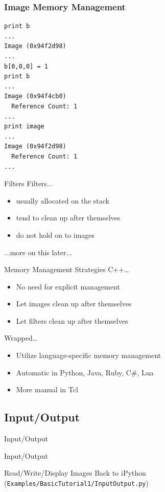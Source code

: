 \begin{frame}[fragile]
\frametitle{Image Memory Management}
\lstpython
\begin{lstlisting}
print b
...
Image (0x94f2d98)
...
b[0,0,0] = 1
print b
...
Image (0x94f4cb0)
  Reference Count: 1
...
print image
...
Image (0x94f2d98)
  Reference Count: 1
...
\end{lstlisting}
\end{frame}


\begin{frame}{Filters}
Filters...
\begin{itemize}
  \item usually allocated on the stack
  \item tend to clean up after themselves
  \item do not hold on to images
\end{itemize}
...more on this later...
\end{frame}

\begin{frame}{Memory Management Strategies}
C++\dots
\begin{itemize}
  \item No need for explicit management
  \item Let images clean up after themselves
  \item Let filters clean up after themselves
\end{itemize}
Wrapped\dots
\begin{itemize}
  \item Utilize language-specific memory management
  \item Automatic in Python, Java, Ruby, C\#, Lua
  \item More manual in Tcl
\end{itemize}
\end{frame}

\subsection{Input/Output}

\begin{frame}{Input/Output}
\fontsize{36pt}{36pt}\selectfont
\center
\begin{center}
Input/Output
\end{center}
\end{frame}

\begin{frame}{Read/Write/Display Images}
Back to iPython (\texttt{Examples/BasicTutorial1/InputOutput.py})
\end{frame}

